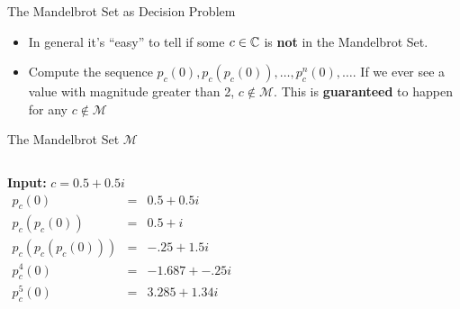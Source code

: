 \documentclass[c]{beamer}
\begin{document}
\begin{frame}{The Mandelbrot Set as Decision Problem}
  
  \begin{itemize}
  \item In general it's ``easy'' to tell if some $c \in \mathbb{C}$ is
    \textbf{not} in the Mandelbrot Set.\pause
  \item Compute the sequence $p_c(0), p_c(p_c(0)), \ldots, p_c^n(0),
    \ldots$. If we ever see a value with magnitude greater than 2, $c
    \notin \mathcal{M}$.  This is \textbf{guaranteed} to happen for
    any $c \notin \mathcal{M}$ \pause
  \end{itemize}
\end{frame}

\begin{frame}{The Mandelbrot Set $\mathcal{M}$}
  \begin{columns}

    {\scriptsize
      \textbf{Input:} $c = 0.5 + 0.5i$
    \begin{align*}
      p_c(0) &=& 0.5 + 0.5i\\
      p_c(p_c(0)) &=& 0.5 + i\\
      p_c(p_c(p_c(0))) &=& -.25 + 1.5i\\
      p_c^4(0) &=& -1.687 + -.25i\\
      p_c^5(0) &=& 3.285 + 1.34i\\
    \end{align*}
    }
    \begin{center}
    \end{center}

  \end{columns}
\end{frame}
\end{document}
